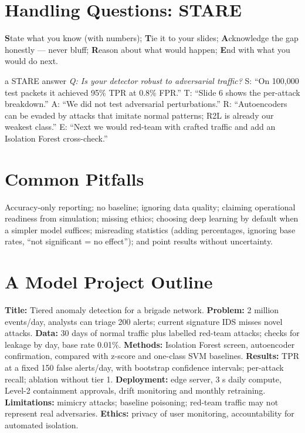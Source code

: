 \documentclass[11pt]{article}
\begin{document}
\section{Handling Questions: STARE}
\textbf{S}tate what you know (with numbers); \textbf{T}ie it to your slides; \textbf{A}cknowledge the gap honestly --- never bluff; \textbf{R}eason about what would happen; \textbf{E}nd with what you would do next.
\begin{example}{a STARE answer}
\emph{Q: Is your detector robust to adversarial traffic?} S: ``On 100,000 test packets it achieved 95\% TPR at 0.8\% FPR.'' T: ``Slide 6 shows the per-attack breakdown.'' A: ``We did not test adversarial perturbations.'' R: ``Autoencoders can be evaded by attacks that imitate normal patterns; R2L is already our weakest class.'' E: ``Next we would red-team with crafted traffic and add an Isolation Forest cross-check.''
\end{example}

\section{Common Pitfalls}
Accuracy-only reporting; no baseline; ignoring data quality; claiming operational readiness from simulation; missing ethics; choosing deep learning by default when a simpler model suffices; misreading statistics (adding percentages, ignoring base rates, ``not significant = no effect''); and point results without uncertainty.

\section{A Model Project Outline}
\textbf{Title:} Tiered anomaly detection for a brigade network. \textbf{Problem:} 2 million events/day, analysts can triage 200 alerts; current signature IDS misses novel attacks. \textbf{Data:} 30 days of normal traffic plus labelled red-team attacks; checks for leakage by day, base rate 0.01\%. \textbf{Methods:} Isolation Forest screen, autoencoder confirmation, compared with z-score and one-class SVM baselines. \textbf{Results:} TPR at a fixed 150 false alerts/day, with bootstrap confidence intervals; per-attack recall; ablation without tier 1. \textbf{Deployment:} edge server, 3 s daily compute, Level-2 containment approvals, drift monitoring and monthly retraining. \textbf{Limitations:} mimicry attacks; baseline poisoning; red-team traffic may not represent real adversaries. \textbf{Ethics:} privacy of user monitoring, accountability for automated isolation.
\clearpage
\end{document}
